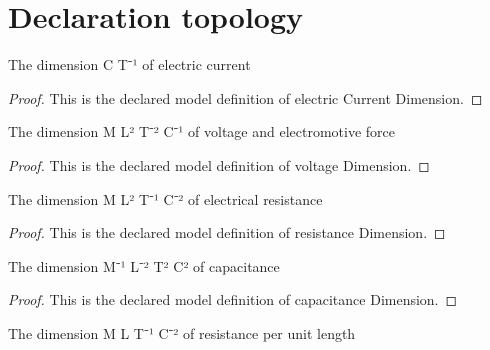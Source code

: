 \section{Declaration topology}
\begin{definition}
  \label{def:physics:phyx-mini-0974:phyxminiproblems-problemphyxmini0974-electriccurrentdimension}
  The dimension C T⁻¹ of electric current
\end{definition}
\begin{proof}
  This is the declared model definition of electric Current Dimension.
\end{proof}
\begin{definition}
  \label{def:physics:phyx-mini-0974:phyxminiproblems-problemphyxmini0974-voltagedimension}
  The dimension M L² T⁻² C⁻¹ of voltage and electromotive force
\end{definition}
\begin{proof}
  This is the declared model definition of voltage Dimension.
\end{proof}
\begin{definition}
  \label{def:physics:phyx-mini-0974:phyxminiproblems-problemphyxmini0974-resistancedimension}
  The dimension M L² T⁻¹ C⁻² of electrical resistance
\end{definition}
\begin{proof}
  This is the declared model definition of resistance Dimension.
\end{proof}
\begin{definition}
  \label{def:physics:phyx-mini-0974:phyxminiproblems-problemphyxmini0974-capacitancedimension}
  The dimension M⁻¹ L⁻² T² C² of capacitance
\end{definition}
\begin{proof}
  This is the declared model definition of capacitance Dimension.
\end{proof}
\begin{definition}
  \label{def:physics:phyx-mini-0974:phyxminiproblems-problemphyxmini0974-resistanceperlengthdimension}
  The dimension M L T⁻¹ C⁻² of resistance per unit length
\end{definition}
